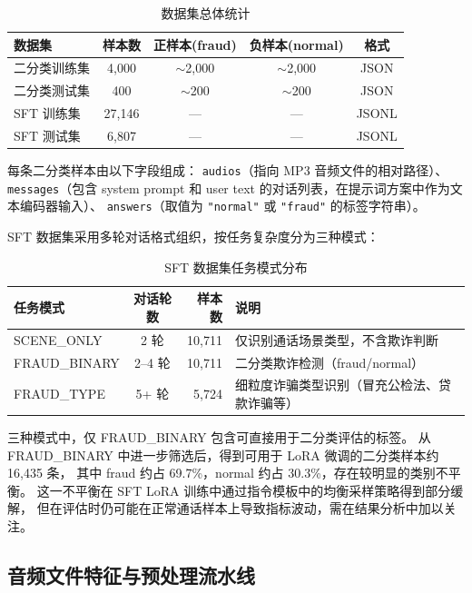 \documentclass[11pt,a4paper]{ctexart}
\begin{document}
\begin{table}[H]\centering
\caption{数据集总体统计}
\label{tab:dataset}
\begin{tabular}{@{}lcccc@{}}\toprule
\textbf{数据集} & \textbf{样本数} & \textbf{正样本(fraud)} & \textbf{负样本(normal)} & \textbf{格式}\\\midrule
二分类训练集 & 4,000 & $\sim$2,000 & $\sim$2,000 & JSON\\
二分类测试集 & 400   & $\sim$200 & $\sim$200 & JSON\\
SFT 训练集    & 27,146 & — & — & JSONL\\
SFT 测试集    & 6,807  & — & — & JSONL\\\bottomrule
\end{tabular}
\end{table}

每条二分类样本由以下字段组成：
\texttt{audios}（指向 MP3 音频文件的相对路径）、
\texttt{messages}（包含 system prompt 和 user text 的对话列表，在提示词方案中作为文本编码器输入）、
\texttt{answers}（取值为 \texttt{"normal"} 或 \texttt{"fraud"} 的标签字符串）。

SFT 数据集采用多轮对话格式组织，按任务复杂度分为三种模式：

\begin{table}[H]\centering
\caption{SFT 数据集任务模式分布}
\label{tab:sft_tasks}
\begin{tabular}{@{}lcrl@{}}\toprule
\textbf{任务模式} & \textbf{对话轮数} & \textbf{样本数} & \textbf{说明}\\\midrule
SCENE\_ONLY   & 2 轮  & 10,711 & 仅识别通话场景类型，不含欺诈判断\\
FRAUD\_BINARY & 2--4 轮 & 10,711 & 二分类欺诈检测（fraud/normal）\\
FRAUD\_TYPE   & 5+ 轮 & 5,724  & 细粒度诈骗类型识别（冒充公检法、贷款诈骗等）\\\bottomrule
\end{tabular}
\end{table}

三种模式中，仅 FRAUD\_BINARY 包含可直接用于二分类评估的标签。
从 FRAUD\_BINARY 中进一步筛选后，得到可用于 LoRA 微调的二分类样本约 16,435 条，
其中 fraud 约占 69.7\%，normal 约占 30.3\%，存在较明显的类别不平衡。
这一不平衡在 SFT LoRA 训练中通过指令模板中的均衡采样策略得到部分缓解，
但在评估时仍可能在正常通话样本上导致指标波动，需在结果分析中加以关注。

\subsection{音频文件特征与预处理流水线}
\end{document}
